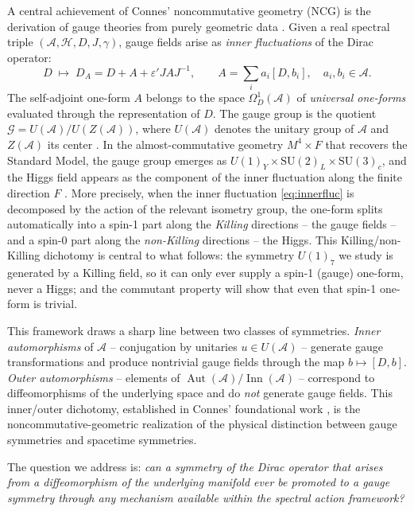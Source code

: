 \documentclass[12pt]{article}
\theoremstyle{definition}
\theoremstyle{remark}
\newcommand{\Hil}{\mathcal{H}}
\newcommand{\Alg}{\mathcal{A}}
\newcommand{\Inn}{\operatorname{Inn}}
\newcommand{\Aut}{\operatorname{Aut}}
\begin{document}
A central achievement of Connes' noncommutative geometry (NCG) is the derivation of gauge theories from purely geometric data \cite{Connes1996gravity, ChamseddineConnes1996spectral, vanSuijlekom2015book}.  Given a real spectral triple $(\Alg, \Hil, D, J, \gamma)$, gauge fields arise as \emph{inner fluctuations} of the Dirac operator:
\begin{equation}\label{eq:innerfluc}
  D \;\longmapsto\; D_A = D + A + \varepsilon' J A J^{-1},
  \qquad
  A = \sum_i a_i [D, b_i],
  \quad a_i, b_i \in \Alg.
\end{equation}
The self-adjoint one-form $A$ belongs to the space $\Omega^1_D(\Alg)$ of \emph{universal one-forms} evaluated through the representation of $D$.  The gauge group is the quotient $\mathcal{G} = U(\Alg)/U(Z(\Alg))$, where $U(\Alg)$ denotes the unitary group of $\Alg$ and $Z(\Alg)$ its center \cite{Connes1996gravity, vanSuijlekom2015book}.  In the almost-commutative geometry $M^4 \times F$ that recovers the Standard Model, the gauge group emerges as $U(1)_Y \times \mathrm{SU}(2)_L \times \mathrm{SU}(3)_c$, and the Higgs field appears as the component of the inner fluctuation along the finite direction $F$ \cite{CCM2007gravity}.  More precisely, when the inner fluctuation \eqref{eq:innerfluc} is decomposed by the action of the relevant isometry group, the one-form splits automatically into a spin-1 part along the \emph{Killing} directions -- the gauge fields -- and a spin-0 part along the \emph{non-Killing} directions -- the Higgs.  This Killing/non-Killing dichotomy is central to what follows: the symmetry $U(1)_7$ we study is generated by a Killing field, so it can only ever supply a spin-1 (gauge) one-form, never a Higgs; and the commutant property will show that even that spin-1 one-form is trivial.

This framework draws a sharp line between two classes of symmetries.  \emph{Inner automorphisms} of $\Alg$ -- conjugation by unitaries $u \in U(\Alg)$ -- generate gauge transformations and produce nontrivial gauge fields through the map $b \mapsto [D, b]$.  \emph{Outer automorphisms} -- elements of $\Aut(\Alg)/\Inn(\Alg)$ -- correspond to diffeomorphisms of the underlying space and do \emph{not} generate gauge fields.  This inner/outer dichotomy, established in Connes' foundational work \cite{Connes1994book, Connes1996gravity}, is the noncommutative-geometric realization of the physical distinction between gauge symmetries and spacetime symmetries.

The question we address is: \emph{can a symmetry of the Dirac operator that arises from a diffeomorphism of the underlying manifold ever be promoted to a gauge symmetry through any mechanism available within the spectral action framework?}
\end{document}
